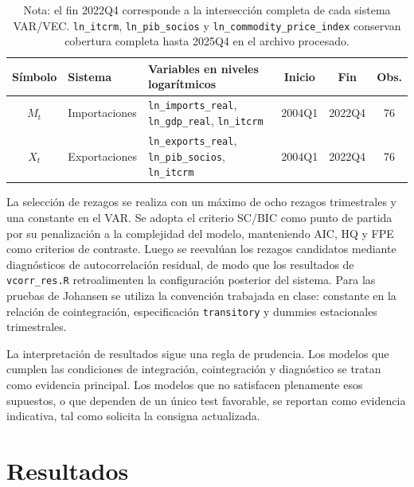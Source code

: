 \documentclass[11pt,a4paper]{article}
\begin{document}
	\begin{table}[H]
		\centering
		\caption{Sistemas iniciales para VAR/VEC.}
		\label{tab:sistemas-iniciales-var-vec}
		\small
		\begin{tabular}{clp{7.1cm}ccc}
			\toprule
			Símbolo & Sistema & Variables en niveles logarítmicos & Inicio & Fin & Obs. \\
			\midrule
			\(M_t\) & Importaciones &
			\texttt{ln\_imports\_real}, \texttt{ln\_gdp\_real}, \texttt{ln\_itcrm}
			& 2004Q1 & 2022Q4 & 76 \\
			\(X_t\) & Exportaciones &
			\texttt{ln\_exports\_real}, \texttt{ln\_pib\_socios}, \texttt{ln\_itcrm}
			& 2004Q1 & 2022Q4 & 76 \\
			\bottomrule
		\end{tabular}
		\caption*{\footnotesize Nota: el fin 2022Q4 corresponde a la intersección
			completa de cada sistema VAR/VEC. \texttt{ln\_itcrm},
			\texttt{ln\_pib\_socios} y \texttt{ln\_commodity\_price\_index} conservan
			cobertura completa hasta 2025Q4 en el archivo procesado.}
	\end{table}
	
	La selección de rezagos se realiza con un máximo de ocho rezagos trimestrales y
	una constante en el VAR. Se adopta el criterio SC/BIC como punto de partida por
	su penalización a la complejidad del modelo, manteniendo AIC, HQ y FPE como
	criterios de contraste. Luego se reevalúan los rezagos candidatos mediante
	diagnósticos de autocorrelación residual, de modo que los resultados de
	\texttt{vcorr\_res.R} retroalimenten la configuración posterior del sistema.
	Para las pruebas de Johansen se utiliza la convención trabajada en clase:
	constante en la relación de cointegración, especificación \texttt{transitory} y
	dummies estacionales trimestrales.
	
	La interpretación de resultados sigue una regla de prudencia. Los modelos que
	cumplen las condiciones de integración, cointegración y diagnóstico se tratan
	como evidencia principal. Los modelos que no satisfacen plenamente esos
	supuestos, o que dependen de un único test favorable, se reportan como evidencia
	indicativa, tal como solicita la consigna actualizada.
	
	\section{Resultados}
	\label{sec:resultados}
	
\end{document}
